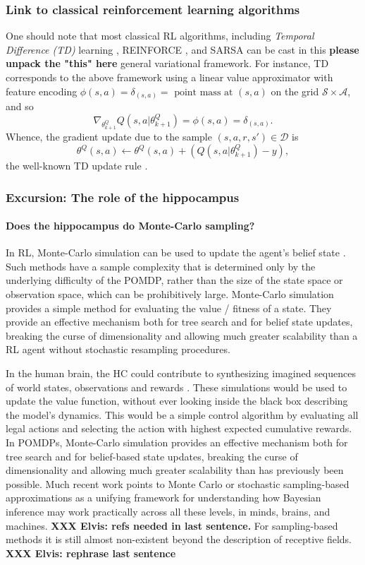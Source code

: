 \documentclass[10pt,letterpaper]{article}
\begin{document}
\subsubsection{Link to classical reinforcement learning algorithms} One should note that most classical RL algorithms, including \textit{Temporal Difference (TD)}
learning \citep{sutton1998reinforcement}, REINFORCE \citep{williams1992}, and SARSA can be
cast in this \textbf{please unpack the "this" here}
general variational framework. For instance, TD corresponds to
the above framework using a linear value approximator with feature encoding
$\phi(s,a) = \delta_{(s,a)} =  \text{ point mass at }(s,a)$ on the grid
$\mathcal S \times \mathcal A$, and so
$$\nabla_{\theta^Q_{k+1}}Q(s, a|\theta^Q_{k+1}) = \phi(s, a) = \delta_{(s,a)}.$$
Whence, the gradient update due to the sample $(s,a,r,s') \in \mathcal D$ is
$$\theta^Q(s,a) \leftarrow \theta^Q(s,a) + (Q(s, a|\theta^Q_{k+1}) - y),$$
the well-known TD update rule \citep{sutton1998reinforcement}.

\subsubsection{Excursion: The role of the hippocampus}
\paragraph{Does the hippocampus do Monte-Carlo sampling?}
In RL, Monte-Carlo simulation can be used to update the agent's belief state
\citep{silver2010monte}. Such methods have a sample complexity that is determined only by the underlying difficulty of the POMDP, rather than the size of the state space or observation space,
which can be prohibitively large.
Monte-Carlo simulation provides a simple method for evaluating the value / fitness of a state.
They provide an effective mechanism both for tree search and for belief state updates, breaking the curse of dimensionality and allowing much greater scalability than a RL agent without stochastic resampling procedures.

In the human brain,
the HC could contribute to synthesizing imagined sequences of world states,
observations and rewards \citep{aronov2017}.
These simulations would be used to update the value function, without ever looking inside the black box describing the model's dynamics. This would be a simple control algorithm by evaluating all legal actions and selecting the action with
highest expected cumulative rewards.
In POMDPs, Monte-Carlo simulation provides an effective mechanism both for tree search and for belief-based state updates, breaking the curse of dimensionality and allowing much greater scalability than has previously been possible.
Much recent work points to Monte Carlo or stochastic sampling-based approximations as a unifying framework for understanding how Bayesian inference may work practically across all these levels, in minds, brains, and machines. \textbf{XXX Elvis: refs needed in last sentence.} For sampling-based methods it is still almost non-existent beyond the description of receptive fields. \textbf{XXX Elvis: rephrase last sentence}
\end{document}
